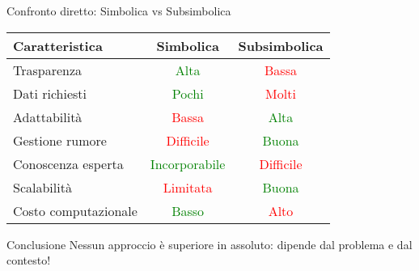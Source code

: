 \documentclass[aspectratio=169,12pt]{beamer}
\begin{document}
\begin{frame}{Confronto diretto: Simbolica vs Subsimbolica}
    \begin{center}
        \begin{tabular}{|l|c|c|}
            \hline
            \textbf{Caratteristica} & \textbf{Simbolica} & \textbf{Subsimbolica} \\
            \hline
            Trasparenza & \textcolor{green}{Alta} & \textcolor{red}{Bassa} \\
            \hline
            Dati richiesti & \textcolor{green}{Pochi} & \textcolor{red}{Molti} \\
            \hline
            Adattabilità & \textcolor{red}{Bassa} & \textcolor{green}{Alta} \\
            \hline
            Gestione rumore & \textcolor{red}{Difficile} & \textcolor{green}{Buona} \\
            \hline
            Conoscenza esperta & \textcolor{green}{Incorporabile} & \textcolor{red}{Difficile} \\
            \hline
            Scalabilità & \textcolor{red}{Limitata} & \textcolor{green}{Buona} \\
            \hline
            Costo computazionale & \textcolor{green}{Basso} & \textcolor{red}{Alto} \\
            \hline
        \end{tabular}
    \end{center}
    
    \vspace{0.5cm}
    
    \begin{block}{Conclusione}
        Nessun approccio è superiore in assoluto: dipende dal problema e dal contesto!
    \end{block}
\end{frame}
%
\end{document}
